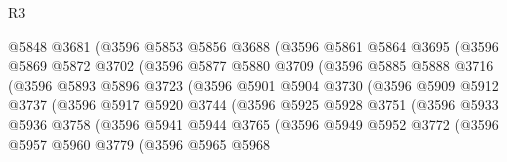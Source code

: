 \begin{lexlean}{R3}
\begin{coremodule}
                      @5848
                      @3681
                      (@3596
                        @5853
                        @5856
                        @3688
                        (@3596
                          @5861
                          @5864
                          @3695
                          (@3596
                            @5869
                            @5872
                            @3702
                            (@3596
                              @5877
                              @5880
                              @3709
                              (@3596
                                @5885
                                @5888
                                @3716
                                (@3596
                                  @5893
                                  @5896
                                  @3723
                                  (@3596
                                    @5901
                                    @5904
                                    @3730
                                    (@3596
                                      @5909
                                      @5912
                                      @3737
                                      (@3596
                                        @5917
                                        @5920
                                        @3744
                                        (@3596
                                          @5925
                                          @5928
                                          @3751
                                          (@3596
                                            @5933
                                            @5936
                                            @3758
                                            (@3596
                                              @5941
                                              @5944
                                              @3765
                                              (@3596
                                                @5949
                                                @5952
                                                @3772
                                                (@3596
                                                  @5957
                                                  @5960
                                                  @3779
                                                  (@3596
                                                    @5965
                                                    @5968

\end{coremodule}
\end{lexlean}
